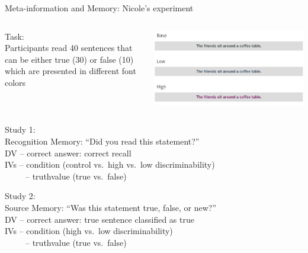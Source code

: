 \documentclass[aspectratio=169]{beamer}
\begin{document}
\begin{frame}{Meta-information and Memory: Nicole's experiment}
      \begin{columns}
        \begin{column}[c]{.62\textwidth}
    {\color{iwmorange}Task:}\\
          Participants read 40 sentences that can be either true (30)
      or false (10) which are presented in different font colors\\ 
        \end{column}
        \begin{column}[c]{.3\textwidth}
      \includegraphics[scale = .3]{figures/material}
        \end{column}
      \end{columns}

  {\color{iwmorange}Study 1:}\\
  Recognition Memory: ``Did you read this statement?''\\
      DV -- correct answer: correct recall\\
      IVs -- condition (control vs.\ high vs.\ low discriminability)\\
      ~~~~~-- truthvalue (true vs.\ false)

    {\color{iwmorange}Study 2:}\\
    Source Memory: ``Was this statement true, false, or
      new?''\\
      DV -- correct answer: true sentence classified as true\\
      IVs -- condition (high vs.\ low discriminability)\\
      ~~~~~-- truthvalue (true vs.\ false)
\end{frame}
\end{document}
